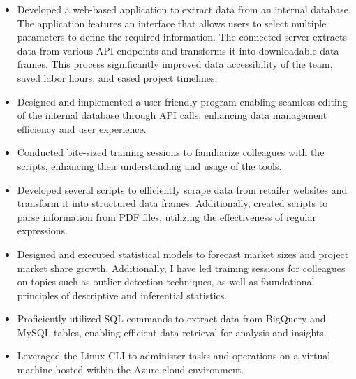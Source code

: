 \documentclass[9pt,a4paper]{altacv}
\begin{document}
\begin{paracol}{2}

\begin{itemize}
    \item Developed a web-based application to extract data from an internal database. The application features an interface that allows users to select multiple parameters to define the required information. The connected server extracts data from various API endpoints and transforms it into downloadable data frames. This process significantly improved data accessibility of the team, saved labor hours, and eased project timelines.
    \item Designed and implemented a user-friendly program enabling seamless editing of the internal database through API calls, enhancing data management efficiency and user experience.
    \item Conducted bite-sized training sessions to familiarize colleagues with the scripts, enhancing their understanding and usage of the tools.
    \item Developed several scripts to efficiently scrape data from retailer websites and transform it into structured data frames. Additionally, created scripts to parse information from PDF files, utilizing the effectiveness of regular expressions.
    \item Designed and executed statistical models to forecast market sizes and project market share growth. Additionally, I have led training sessions for colleagues on topics such as outlier detection techniques, as well as foundational principles of descriptive and inferential statistics.
    \item Proficiently utilized SQL commands to extract data from BigQuery and MySQL tables, enabling efficient data retrieval for analysis and insights.
    \item Leveraged the Linux CLI to administer tasks and operations on a virtual machine hosted within the Azure cloud environment.
\end{itemize}


\end{paracol}
\end{document}
